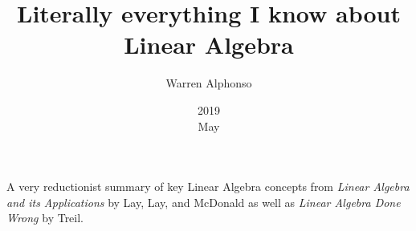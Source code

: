 \documentclass[a4paper,11pt]{book}
\title{Literally everything I know about Linear Algebra}
\date{2019 \\ May}
\author{Warren Alphonso}
\theoremstyle{definition}
\begin{document}
\frontmatter 
{\let\cleardoublepage\clearpage 
\maketitle
\tableofcontents
}

\mainmatter
A very reductionist summary of key Linear Algebra concepts from \textit{Linear Algebra and its Applications} by Lay, Lay, and McDonald as well as \textit{Linear Algebra Done Wrong} by Treil. 

%


\end{document}
